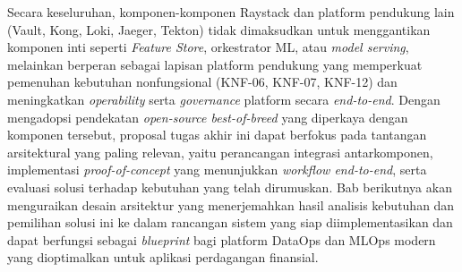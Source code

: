 Secara keseluruhan, komponen-komponen Raystack dan platform pendukung lain (Vault, Kong, Loki, Jaeger, Tekton) tidak dimaksudkan untuk menggantikan komponen inti seperti \textit{Feature Store}, orkestrator ML, atau \textit{model serving}, melainkan berperan sebagai lapisan platform pendukung yang memperkuat pemenuhan kebutuhan nonfungsional (KNF-06, KNF-07, KNF-12) dan meningkatkan \textit{operability} serta \textit{governance} platform secara \textit{end-to-end}. Dengan mengadopsi pendekatan \textit{open-source best-of-breed} yang diperkaya dengan komponen tersebut, proposal tugas akhir ini dapat berfokus pada tantangan arsitektural yang paling relevan, yaitu perancangan integrasi antarkomponen, implementasi \textit{proof-of-concept} yang menunjukkan \textit{workflow end-to-end}, serta evaluasi solusi terhadap kebutuhan yang telah dirumuskan. Bab berikutnya akan menguraikan desain arsitektur yang menerjemahkan hasil analisis kebutuhan dan pemilihan solusi ini ke dalam rancangan sistem yang siap diimplementasikan dan dapat berfungsi sebagai \textit{blueprint} bagi platform DataOps dan MLOps modern yang dioptimalkan untuk aplikasi perdagangan finansial.